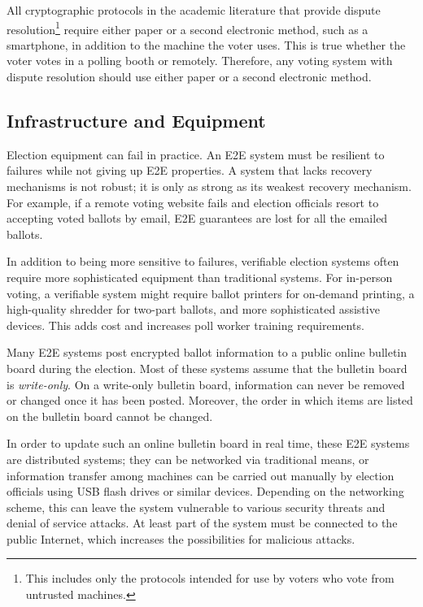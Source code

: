 All cryptographic protocols in the academic literature that provide
dispute resolution\footnote{This includes only the protocols intended
  for use by voters who vote from untrusted machines.}  require either
paper or a second electronic method, such as a smartphone, in addition
to the machine the voter uses. This is true whether the voter votes in
a polling booth or remotely. Therefore, any voting system with dispute
resolution should use either paper or a second electronic method.

\subsection{Infrastructure and Equipment}

Election equipment can fail in practice. An E2E system must be
resilient to failures while not giving up E2E properties. A system
that lacks recovery mechanisms is not robust; it is only as strong as
its weakest recovery mechanism. For example, if a remote voting
website fails and election officials resort to accepting voted ballots
by email, E2E guarantees are lost for all the emailed ballots.

In addition to being more sensitive to failures, verifiable election
systems often require more sophisticated equipment than traditional
systems. For in-person voting, a verifiable system might require
ballot printers for on-demand printing, a high-quality shredder for
two-part ballots, and more sophisticated assistive devices. This adds
cost and increases poll worker training requirements.

Many E2E systems post encrypted ballot information to a public online
bulletin board during the election. Most of these systems assume that
the bulletin board is \emph{write-only}. On a write-only bulletin
board, information can never be removed or changed once it has been
posted. Moreover, the order in which items are listed on the bulletin
board cannot be changed.

In order to update such an online bulletin board in real time, these
E2E systems are distributed systems; they can be networked via
traditional means, or information transfer among machines can be
carried out manually by election officials using USB flash drives or
similar devices. Depending on the networking scheme, this can leave
the system vulnerable to various security threats and denial of
service attacks. At least part of the system must be connected to the
public Internet, which increases the possibilities for malicious
attacks.

